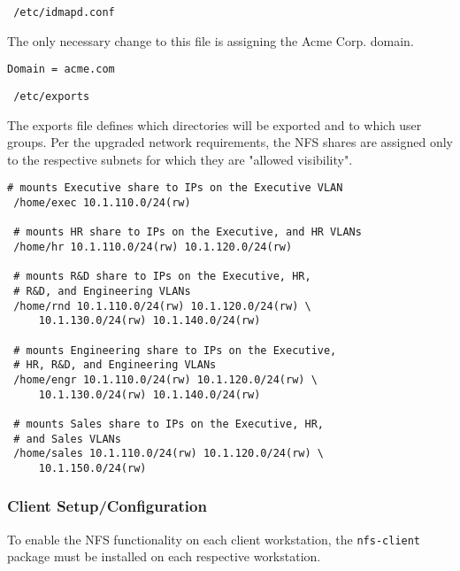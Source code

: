 \begin{lstlisting}
 /etc/idmapd.conf
\end{lstlisting}
\vspace{1em}

\noindent
The only necessary change to this file is assigning the Acme Corp. domain. \\

\begin{lstlisting}[backgroundcolor=\color{Gray}]
 Domain = acme.com
\end{lstlisting}

\begin{lstlisting}
 /etc/exports
\end{lstlisting}
\vspace{1em}

\noindent
The exports file defines which directories will be exported and to which
user groups. Per the upgraded network requirements, the NFS shares are assigned 
only to the respective subnets for which they are "allowed visibility". \\

\begin{lstlisting}[backgroundcolor=\color{Gray}]
 # mounts Executive share to IPs on the Executive VLAN
 /home/exec 10.1.110.0/24(rw)

 # mounts HR share to IPs on the Executive, and HR VLANs
 /home/hr 10.1.110.0/24(rw) 10.1.120.0/24(rw)

 # mounts R&D share to IPs on the Executive, HR, 
 # R&D, and Engineering VLANs
 /home/rnd 10.1.110.0/24(rw) 10.1.120.0/24(rw) \
     10.1.130.0/24(rw) 10.1.140.0/24(rw)

 # mounts Engineering share to IPs on the Executive, 
 # HR, R&D, and Engineering VLANs
 /home/engr 10.1.110.0/24(rw) 10.1.120.0/24(rw) \
     10.1.130.0/24(rw) 10.1.140.0/24(rw)

 # mounts Sales share to IPs on the Executive, HR, 
 # and Sales VLANs
 /home/sales 10.1.110.0/24(rw) 10.1.120.0/24(rw) \
     10.1.150.0/24(rw)
\end{lstlisting}

\subsubsection{Client Setup/Configuration}
To enable the NFS functionality on each client workstation, the
\lstinline$nfs-client$ package must be installed on each respective workstation.
\\

